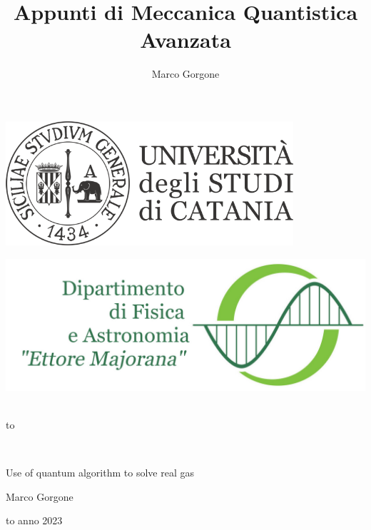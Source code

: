 \documentclass[openany,italian]{book}
\begin{document}
\title{Appunti di Meccanica Quantistica Avanzata}
\author{Marco Gorgone}

\thispagestyle{empty}
\begin{center}

\begin{minipage}[c]{0.45\textwidth}
\begin{flushleft}
\includegraphics[width=0.8\textwidth]{build/logo_unict_orizzontale.png}
\end{flushleft}
\end{minipage}
\hfill
\begin{minipage}[c]{0.45\textwidth}
\begin{flushright}
\includegraphics[width=\textwidth]{build/logo_dfa_orizzontale}
\end{flushright}
\end{minipage}\\
\medskip
\hbox to \textwidth{\hrulefill}

\vfill
\vfill


\uppercase{}\\

\vfill
\begin{center}
    \large{Use of quantum algorithm to solve real gas}
    
    \vspace{0.5cm}
    
    \large{Marco Gorgone}    
\end{center}

\vfill
\vfill
\hbox to \textwidth{\hrulefill}
{\sc anno 2023}
\end{center}

\tableofcontents

%
\end{document}
